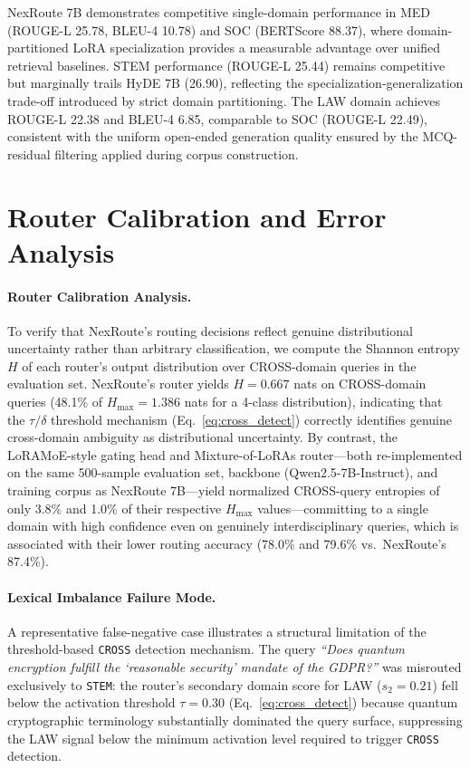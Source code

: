 \documentclass[a4paper,fleql]{cas-sc}
\begin{document}
\vspace{6pt plus 4pt minus 3pt}
NexRoute 7B demonstrates competitive single-domain performance in MED
(ROUGE-L 25.78, BLEU-4 10.78) and SOC (BERTScore 88.37), where
domain-partitioned LoRA specialization provides a measurable advantage over
unified retrieval baselines. STEM performance (ROUGE-L 25.44) remains
competitive but marginally trails HyDE 7B (26.90), reflecting the
specialization-generalization trade-off introduced by strict domain
partitioning. The LAW domain achieves ROUGE-L 22.38 and BLEU-4 6.85, comparable to
SOC (ROUGE-L 22.49), consistent with the uniform open-ended generation
quality ensured by the MCQ-residual filtering applied during corpus
construction.


\section{Router Calibration and Error Analysis}
\label{app:error_analysis}

\paragraph{Router Calibration Analysis.}
To verify that NexRoute's routing decisions reflect genuine distributional
uncertainty rather than arbitrary classification, we compute the Shannon
entropy $H$ of each router's output distribution over CROSS-domain
queries in the evaluation set.
NexRoute's router yields $H{=}0.667$ nats on CROSS-domain queries
(48.1\% of $H_{\max}{=}1.386$ nats for a 4-class distribution),
indicating that the $\tau/\delta$ threshold mechanism
(Eq.~\ref{eq:cross_detect}) correctly identifies genuine cross-domain
ambiguity as distributional uncertainty.
By contrast, the LoRAMoE-style gating head and Mixture-of-LoRAs router---both
re-implemented on the same 500-sample evaluation set, backbone
(Qwen2.5-7B-Instruct), and training corpus as NexRoute 7B---yield
normalized CROSS-query entropies of only 3.8\% and 1.0\%
of their respective $H_{\max}$ values---committing to a single
domain with high confidence even on genuinely interdisciplinary
queries, which is associated with their lower routing accuracy
(78.0\% and 79.6\% vs.\ NexRoute's 87.4\%).

\paragraph{Lexical Imbalance Failure Mode.}
A representative false-negative case illustrates a structural limitation of the
threshold-based \texttt{CROSS} detection mechanism. The query \textit{``Does
quantum encryption fulfill the `reasonable security' mandate of the GDPR?''}
was misrouted exclusively to \texttt{STEM}: the router's secondary domain score
for LAW ($s_2 = 0.21$) fell below the activation threshold $\tau = 0.30$
(Eq.~\ref{eq:cross_detect}) because quantum cryptographic terminology
substantially dominated the query surface, suppressing the LAW signal below the
minimum activation level required to trigger \texttt{CROSS} detection.
\end{document}

